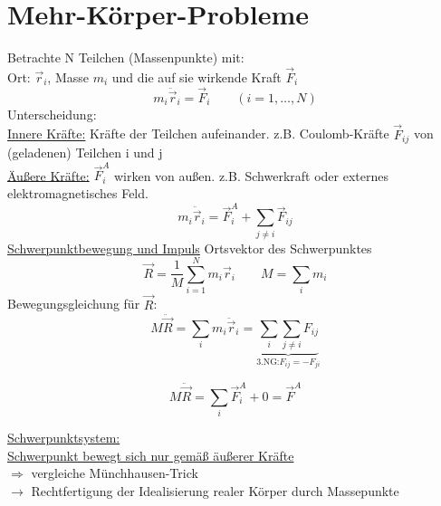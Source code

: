 \documentclass[titlepage,12pt,a4paper,ngerman]{report}
\begin{document}
{\section{Mehr-Körper-Probleme}
Betrachte N Teilchen (Massenpunkte) mit:\\
Ort: $\vec{r}_i$, Masse $m_i$ und die auf sie wirkende Kraft $\vec{F}_i$ 
$$m_i \ddot{\vec{r}}_i = \vec{F}_i \qquad (i = 1, \dots , N)$$
Unterscheidung:\\
\underline{Innere Kräfte:} Kräfte der Teilchen aufeinander. z.B. Coulomb-Kräfte $\vec{F}_{ij}$ von (geladenen) Teilchen i und j\\
\underline{Äußere Kräfte:} $\vec{F}^A_i$ wirken von außen. z.B. Schwerkraft oder externes elektromagnetisches Feld.\\
$$m_i \ddot{\vec{r}}_i = \vec{F}_i^A + \sum _{j\neq i} \vec{F}_{ij}$$
\underline{Schwerpunktbewegung und Impuls}
Ortsvektor des Schwerpunktes
$$\vec{R} = \frac{1}{M} \sum_{i=1}^{N} m_i \vec{r}_i \qquad M = \sum_{i} m_i$$
Bewegungsgleichung für $\vec{R}$:
$$M\ddot{\vec{R}} = \sum_{i} m_i \ddot{\vec{r}}_i = \underbrace{\sum_{i} \sum_{j\neq i} F_{ij}}_{\textrm{3.NG:} F_{ij} = - F_{ji}}$$


$$M \ddot{\vec{R}} = \sum_{i} \vec{F}_i^A + 0 =\vec{F}^A$$

\underline{Schwerpunktsystem:}\\ 
\indent \underline{Schwerpunkt bewegt sich nur gemäß äußerer Kräfte}\\ 
$\Rightarrow$ vergleiche Münchhausen-Trick\\
$\rightarrow$ Rechtfertigung der Idealisierung realer Körper durch Massepunkte


}
\end{document}

